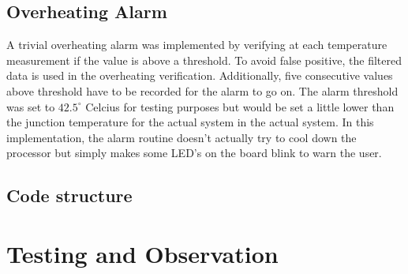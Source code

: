 \documentclass[12pt]{article}
\begin{document}



\subsection{Overheating Alarm}
A trivial overheating alarm was implemented by verifying at each temperature measurement if the value is above a threshold. To avoid false positive, the filtered data is used in the overheating verification. Additionally, five consecutive values above threshold have to be recorded for the alarm to go on. The alarm threshold was set to $42.5^\circ$ Celcius for testing purposes but would be set a little lower than the junction temperature for the actual system in the actual system. In this implementation, the alarm routine doesn't actually try to cool down the processor but simply makes some LED's on the board blink to warn the user.

\subsection{Code structure}


\section{Testing and Observation}
\end{document}
